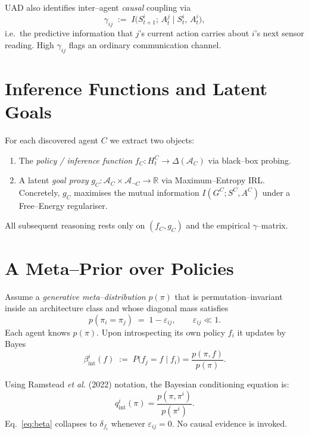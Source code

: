 \documentclass[11pt]{article}
\newcommand{\policy}{\pi}              %
\begin{document}
UAD also identifies inter--agent \emph{causal} coupling via
\begin{equation}\label{eq:gamma}
\gamma_{ij} \;:=\; I\bigl(S^i_{t+1};\,A^j_t\mid S^i_t,\,A^i_t\bigr),
\end{equation}
i.e.~the predictive information that $j$’s current action carries about $i$’s
next sensor reading.  High $\gamma_{ij}$ flags an ordinary communication
channel.

\section{Inference Functions and Latent Goals}
For each discovered agent $C$ we extract two objects:
\begin{enumerate}
  \item The \emph{policy / inference function}
        $f_C\colon H^C_t\to\Delta(\mathcal A_C)$ via black--box probing.
  \item A latent \emph{goal proxy} $g_C\colon \mathcal A_C\times\mathcal A_{\neg C}
        \to\mathbb R$ via Maximum--Entropy IRL\cite{NgRussell2000}.  Concretely, $g_C$
        maximises the mutual information $I(G^C;S^C,A^C)$ under a Free–Energy
        regulariser\cite{Friston2010}.
\end{enumerate}
All subsequent reasoning rests only on $(f_C,g_C)$ and the empirical
$\gamma$--matrix.

\section{A Meta--Prior over Policies}
Assume a \emph{generative meta--distribution}
$p(\policy)$ that is permutation--invariant inside an
architecture class and whose diagonal mass satisfies
\begin{equation}\label{eq:alpha}
p(\policy_i=\policy_j)\;=\;1-\varepsilon_{ij}, \qquad \varepsilon_{ij}\ll1.
\end{equation}
Each agent knows $p(\policy)$.  Upon introspecting its own policy $f_i$ it
updates by Bayes
\begin{equation}\label{eq:beta}
\beta^{i}_{\text{int}}(f)\;:=\;P\bigl(f_j=f\mid f_i\bigr)=\frac{p(\policy,f)}{p(\policy)}.
\end{equation}

Using Ramstead \textit{et al.} (2022) notation, the Bayesian conditioning equation is:
\begin{equation}
q_{\text{int}}^{i}(\policy)=\frac{p(\policy,\policy^{i})}{p(\policy^{i})}.
\end{equation}
Eq.~\eqref{eq:beta} collapses to $\delta_{f_i}$ whenever $\varepsilon_{ij}=0$.
No causal evidence is invoked.
\end{document}
